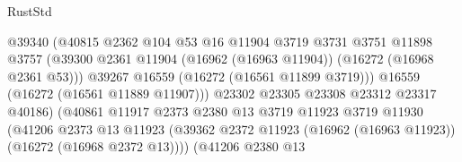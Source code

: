 \begin{lexlean}{RustStd}
\begin{coremodule}
                                            @39340
                                            (@40815
                                              @2362
                                              @104
                                              @53
                                              @16
                                              @11904
                                              @3719
                                              @3731
                                              @3751
                                              @11898
                                              @3757
                                              (@39300
                                                @2361
                                                @11904
                                                (@16962 (@16963 @11904))
                                                (@16272 (@16968 @2361 @53)))
                                              @39267
                                              @16559
                                              (@16272 (@16561 @11899 @3719)))
                                            @16559
                                            (@16272 (@16561 @11889 @11907)))
                                          @23302
                                          @23305
                                          @23308
                                          @23312
                                          @23317
                                          @40186)
                                        (@40861
                                          @11917
                                          @2373
                                          @2380
                                          @13
                                          @3719
                                          @11923
                                          @3719
                                          @11930
                                          (@41206
                                            @2373
                                            @13
                                            @11923
                                            (@39362
                                              @2372
                                              @11923
                                              (@16962 (@16963 @11923))
                                              (@16272 (@16968 @2372 @13))))
                                          (@41206
                                            @2380
                                            @13

\end{coremodule}
\end{lexlean}
